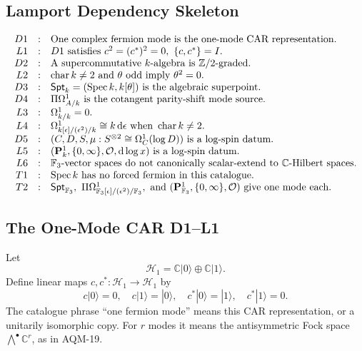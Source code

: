 \subsection{Lamport Dependency Skeleton}
\[
\begin{array}{rcl}
D1&:&\text{One complex fermion mode is the one-mode CAR representation.}\\
L1&:&D1\text{ satisfies }c^2=(c^*)^2=0,\ \{c,c^*\}=I.\\
D2&:&\text{A supercommutative }k\text{-algebra is }\mathbb Z/2\text{-graded}.\\
L2&:&\operatorname{char}k\ne2\text{ and }\theta\text{ odd imply }\theta^2=0.\\
D3&:&\mathsf{Spt}_k=(\operatorname{Spec} k,k[\theta])\text{ is the algebraic superpoint.}\\
D4&:&\Pi\Omega^1_{A/k}\text{ is the cotangent parity-shift mode source.}\\
L3&:&\Omega^1_{k/k}=0.\\
L4&:&\Omega^1_{k[\epsilon]/(\epsilon^2)/k}\cong k\,\mathrm d\epsilon
      \text{ when }\operatorname{char}k\ne2.\\
D5&:&(C,D,S,\mu:S^{\otimes2}\cong\Omega^1_C(\log D))
      \text{ is a log-spin datum.}\\
L5&:&(\mathbf P^1_k,\{0,\infty\},\mathcal O,\mathrm d\log x)
      \text{ is a log-spin datum.}\\
L6&:&\mathbb F_3\text{-vector spaces do not canonically scalar-extend to }
      \mathbb C\text{-Hilbert spaces.}\\
T1&:&\operatorname{Spec} k\text{ has no forced fermion in this catalogue.}\\
T2&:&\mathsf{Spt}_{\mathbb F_3},\ \Pi\Omega^1_{\mathbb F_3[\epsilon]/(\epsilon^2)/\mathbb F_3},
      \text{ and }(\mathbf P^1_{\mathbb F_3},\{0,\infty\},\mathcal O)
      \text{ give one mode each.}
\end{array}
\]

\subsection{The One-Mode CAR D1--L1}
Let
\[
  \mathcal H_1=\mathbb C|0\rangle\oplus\mathbb C|1\rangle .
\]
Define linear maps \(c,c^*:\mathcal H_1\to\mathcal H_1\) by
\[
  c|0\rangle=0,\quad c|1\rangle=|0\rangle,\quad
  c^*|0\rangle=|1\rangle,\quad c^*|1\rangle=0 .
\]
The catalogue phrase ``one fermion mode'' means this CAR representation, or a
unitarily isomorphic copy.  For \(r\) modes it means the antisymmetric Fock
space \(\bigwedge^\bullet\mathbb C^r\), as in AQM-19.

